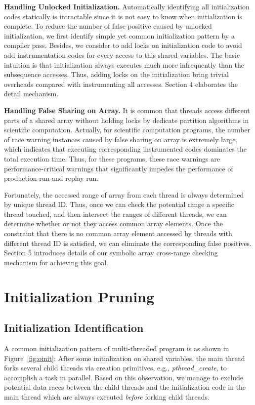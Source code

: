 \documentclass[10pt,onecolumn,letterpaper]{article}
\begin{document}
\textbf{Handling Unlocked Initialization.} Automatically identifying
all initialization codes statically is intractable since it is not
easy to know when initialization is complete. To reduce the number
of false positive caused by unlocked initialization, we first
identify simple yet common initialization pattern by a compiler
pass. Besides, we consider to add locks on initialization code to
avoid add instrumentation codes for every access to this shared
variables. The basic intuition is that initialization always
executes much more infrequently than the subsequence accesses. Thus,
adding locks on the initialization bring trivial overheads compared
with instrumenting all accesses. Section 4 elaborates the detail
mechanism.

\textbf{Handling False Sharing on Array.} It is common that threads
access different parts of a shared array without holding locks by
dedicate partition algorithms in scientific computation. Actually,
for scientific computation programs, the number of race warning
instances caused by false sharing on array is extremely large, which
indicates that executing corresponding instrumented codes dominates
the total execution time. Thus, for these programs, these race
warnings are performance-critical warnings that significantly
impedes the performance of production run and replay run.


Fortunately, the accessed range of array from each thread is always
determined by unique thread ID. Thus, once we can check the
potential range a specific thread touched, and then intersect the
ranges of different threads, we can determine whether or not they
access common array elements. Once the constraint that there is no
common array element accessed by threads with different thread ID is
satisfied, we can eliminate the corresponding false positives.
Section 5 introduces details of our symbolic array cross-range
checking mechanism for achieving this goal.



\section{Initialization Pruning}
\subsection{Initialization Identification}

A common initialization pattern of multi-threaded program is as
shown in Figure~\ref{fig:oinit}: After some initialization on shared
variables, the main thread forks several child threads via creation
primitives, e.g., \emph{pthread\_create}, to accomplish a task in
parallel. Based on this observation, we manage to exclude potential
data races between the child threads and the initialization code in
the main thread which are always executed \emph{before} forking
child threads.
\end{document}
